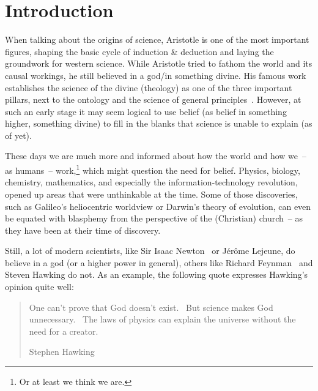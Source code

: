 \section{Introduction}

When talking about the origins of science, Aristotle is one of the most important figures, shaping the basic cycle of induction \& deduction and laying the groundwork for western science.
While Aristotle tried to fathom the world and its causal workings, he still believed in a god/in something divine.
His famous work  establishes the science of the divine (theology) as one of the three important pillars, next to the ontology and the science of general principles~\cite{aristotle350}.
However, at such an early stage it may seem logical to use belief (as belief in something higher, something divine) to fill in the blanks that science is unable to explain (as of yet).

%
These days we are much more  and informed about how the world and how we~-- as humans~-- work,\footnote{Or at least we think we are.} which might question the need for belief.
Physics, biology, chemistry, mathematics, and especially the information-technology revolution, opened up areas that were unthinkable at the time.
Some of those discoveries, such as Galileo's heliocentric worldview or Darwin's theory of evolution, can even be equated with blasphemy from the perspective of the (Christian) church~-- as they have been at their time of discovery.

Still, a lot of modern scientists, like Sir Isaac Newton~\cite[p. 315]{westfall1983} or Jérôme Lejeune, do believe in a god (or a higher power in general), others like Richard Feynman~\cite{feynman2001,brian2001} and Steven Hawking do not.
As an example, the following quote expresses Hawking's opinion quite well:
\blockquote[Stephen Hawking]{One can't prove that God doesn't exist. \quoteshorten\ But science makes God unnecessary. \quoteshorten\ The laws of physics can explain the universe without the need for a creator.}


